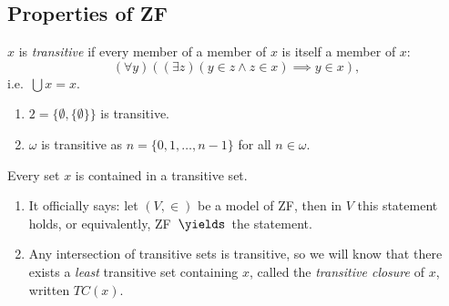 \documentclass[a4paper]{article}
\begin{document}
\subsection{Properties of ZF}

\begin{definition}[Transitive]
  \(x\) is \emph{transitive} if every member of a member of \(x\) is itself a member of \(x\):
  \[
    (\forall y) ((\exists z) (y \in z \land z \in x) \implies y \in x),
  \]
  i.e.\ \(\bigcup x = x\).
\end{definition}

\begin{eg}\leavevmode
  \begin{enumerate}
  \item \(2 = \{\emptyset, \{\emptyset\}\}\) is transitive.
  \item \(\omega\) is transitive as \(n = \{0, 1, \dots, n - 1\}\) for all \(n \in \omega\).
  \end{enumerate}
\end{eg}

\begin{lemma}
  Every set \(x\) is contained in a transitive set.
\end{lemma}

\begin{remark}\leavevmode
  \begin{enumerate}
  \item It officially says: let \((V, \in)\) be a model of ZF, then in \(V\) this statement holds, or equivalently, ZF~\(\yields\)~the statement.
  \item Any intersection of transitive sets is transitive, so we will know that there exists a \emph{least} transitive set containing \(x\), called the \emph{transitive closure} of \(x\), written \(TC(x)\).
  \end{enumerate}
\end{remark}
\end{document}
